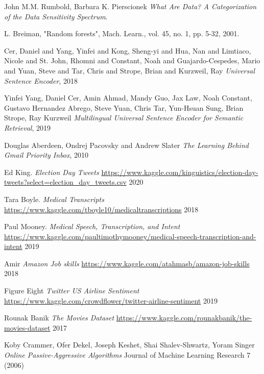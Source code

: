 \begin{thebibliography}{9}
John M.M. Rumbold, Barbara K. Pierscionek\newline
\textit{What Are Data? A Categorization of the Data Sensitivity Spectrum}.

L. Breiman, "Random forests",\newline
Mach. Learn., vol. 45, no. 1, pp. 5-32, 2001.

Cer, Daniel  and Yang, Yinfei  and Kong, Sheng-yi  and
Hua, Nan  and Limtiaco, Nicole  and St. John, Rhomni  and
Constant, Noah  and Guajardo-Cespedes, Mario  and Yuan, Steve  and
Tar, Chris  and Strope, Brian  and Kurzweil, Ray\newline
\textit{Universal Sentence Encoder}, 2018

Yinfei Yang, Daniel Cer, Amin Ahmad, Mandy Guo, Jax Law, Noah Constant, Gustavo Hernandez Abrego, Steve Yuan, Chris Tar, Yun-Hsuan Sung, Brian Strope, Ray Kurzweil
\textit{Multilingual Universal Sentence Encoder for Semantic Retrieval}, 2019

Douglas Aberdeen, Ondrej Pacovsky  and Andrew Slater\newline
\textit{The Learning Behind Gmail Priority Inbox}, 2010

Ed King.
\textit{Election Day Tweets}
\url{https://www.kaggle.com/kinguistics/election-day-tweets?select=election_day_tweets.csv}
2020

Tara Boyle.
\textit{Medical Transcripts}
\url{https://www.kaggle.com/tboyle10/medicaltranscriptions}
2018

Paul Mooney.
\textit{Medical Speech, Transcription, and Intent}
\url{https://www.kaggle.com/paultimothymooney/medical-speech-transcription-and-intent}
2019

Amir
\textit{Amazon Job skills}
\url{https://www.kaggle.com/atahmasb/amazon-job-skills}
2018

Figure Eight
\textit{Twitter US Airline Sentiment}
\url{https://www.kaggle.com/crowdflower/twitter-airline-sentiment}
2019

Rounak Banik
\textit{The Movies Dataset}
\url{https://www.kaggle.com/rounakbanik/the-movies-dataset}
2017

Koby Crammer, Ofer Dekel, Joseph Keshet, Shai Shalev-Shwartz, Yoram Singer\newline
\textit{Online Passive-Aggressive Algorithms}\newline
Journal of Machine Learning Research 7 (2006) 


\end{thebibliography}

